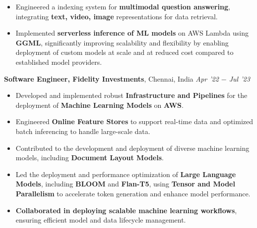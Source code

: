 \documentclass[10pt,a4]{article}
\begin{document}
{\begin{flushleft}
\begin{itemize}
        \item Engineered a indexing system for \textbf{multimodal question answering}, integrating \textbf{text, video, image} representations for data retrieval.
        \item Implemented \textbf{serverless inference of ML models} on AWS Lambda using \textbf{GGML}, significantly improving scalability and flexibility by enabling deployment of custom models at scale and at reduced cost compared to established model providers.

    \end{itemize}	
    
    \vspace{0.5mm}
    \hspace{1.5mm} \textbf{\large Software Engineer, Fidelity Investments},  Chennai, India \hfill \textit{\large Apr '22 $-$ Jul '23}	\\
    \begin{itemize}
        \item Developed and implemented robust \textbf{Infrastructure and Pipelines} for the deployment of \textbf{Machine Learning Models} on \textbf{AWS}.  
         \item Engineered \textbf{Online Feature Stores} to support real-time data and optimized batch inferencing to handle large-scale data.
         \item Contributed to the development and deployment of diverse machine learning models, including \textbf{Document Layout Models}.
         \item Led the deployment and performance optimization of \textbf{Large Language Models}, including \textbf{BLOOM} and \textbf{Flan-T5}, using \textbf{Tensor and Model Parallelism} to accelerate token generation and enhance model performance.
        \item \textbf{Collaborated in deploying scalable machine learning workflows}, ensuring efficient model and data lifecycle management.
    \end{itemize}	
    

\end{flushleft}}
\end{document}
